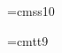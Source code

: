 \font\secfont=cmss10
\def\section #1{
  \vskip\baselineskip
  \noindent{\secfont{}#1}
  \hfill\vskip\baselineskip
  \everypar={{\setbox0\lastbox}\everypar={}}}

%
\font\ninett=cmtt9
\def\symbol{\begingroup\catcode`\_=12\relax\symbolimpl}
\def\symbolimpl#1{{\ninett #1}\endgroup}

